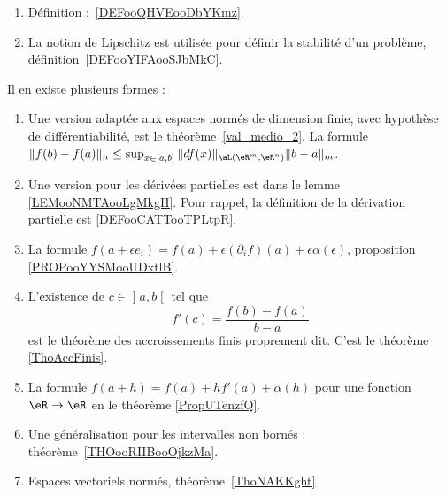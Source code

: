     \begin{enumerate}
    \item
        Définition :~\ref{DEFooQHVEooDbYKmz}.
    \item
        La notion de Lipschitz est utilisée pour définir la stabilité d'un problème, définition~\ref{DEFooYIFAooSJbMkC}.
    \end{enumerate}


            \label{INTERNooXFNTooNNaOzP}
    Il en existe plusieurs formes :
    \begin{enumerate}
        \item
            Une version adaptée aux espaces normés de dimension finie, avec hypothèse de différentiabilité, est le théorème~\ref{val_medio_2}. La formule $\|f(b)-f(a)\|_n\leq \sup_{x\in[a,b]}\|df(x)\|_{\aL(\eR^m,\eR^n)}\|b-a\|_m$.
        \item
            Une version pour les dérivées partielles est dans le lemme \ref{LEMooNMTAooLgMkgH}. Pour rappel, la définition de la dérivation partielle est \ref{DEFooCATTooTPLtpR}.
        \item
            La formule \( f(a+\epsilon e_i)=f(a)+\epsilon(\partial_if)(a)+\epsilon\alpha(\epsilon)\), proposition \ref{PROPooYYSMooUDxtlB}.
        \item
        L'existence de \( c\in \mathopen] a , b \mathclose[\) tel que
            \begin{equation}
                f'(c)=\frac{ f(b)-f(a) }{ b-a }
            \end{equation}
            est le théorème des accroissements finis proprement dit. C'est le théorème \ref{ThoAccFinis}.
        \item
            La formule \( f(a+h)=f(a)+hf'(a)+\alpha(h)\) pour une fonction \( \eR\to \eR\) en le théorème \ref{PropUTenzfQ}.
        \item
            Une généralisation pour les intervalles non bornés : théorème~\ref{THOooRIIBooOjkzMa}.
        \item
            Espaces vectoriels normés, théorème~\ref{ThoNAKKght}
    \end{enumerate}

    \label{THEMEooGVCCooHBrNNd}

